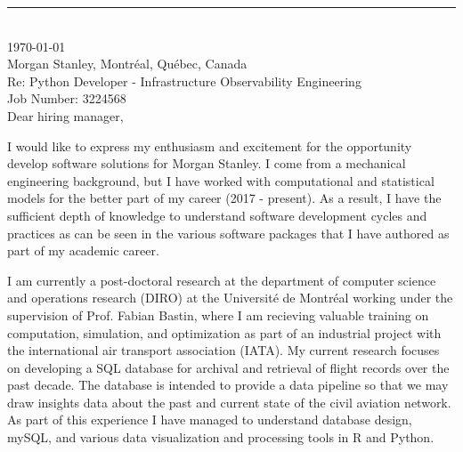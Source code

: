 \documentclass[12pt]{article} %
\begin{document}
\medskip %
\rule[0pt]{\textwidth}{1pt}\\
\today\\[6pt]
Morgan Stanley, Montr\'{e}al, Qu\'{e}bec, Canada\\
Re: Python Developer - Infrastructure Observability Engineering\\
Job Number:  3224568\\[6pt] \medskip
Dear hiring manager,

\medskip %
I would like to express my enthusiasm and excitement for the opportunity develop software solutions for Morgan Stanley. I come from a mechanical engineering background, but I have worked with computational and statistical models for the better part of my career (2017 - present). As a result, I have the sufficient depth of knowledge to understand software development cycles and practices as can be seen in the various software packages that I have authored as part of my academic career.

\medskip %

I am currently a post-doctoral research at the department of computer science and operations research (DIRO) at the Universit\'{e} de Montr\'{e}al working under the supervision of Prof. Fabian Bastin, where I am recieving valuable training on computation, simulation, and optimization as part of an industrial project with the international air transport association (IATA). My current research focuses on developing a SQL database for archival and retrieval of flight records over the past decade. The database is intended to provide a data pipeline so that we may draw insights data about the past and current state of the civil aviation network. As part of this experience I have managed to understand database design, mySQL, and various data visualization and processing tools in R and Python.

\medskip %
\end{document}
